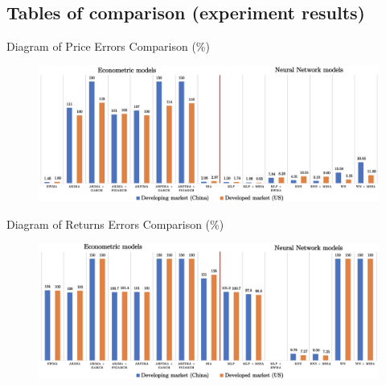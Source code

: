 \documentclass[11pt, aspectratio= 169]{beamer}
\begin{document}
	\subsection{Tables of comparison (experiment results)}
	\begin{frame}{Diagram of Price Errors Comparison (\%)}
		\begin{figure}[H]
			\includegraphics[width= 14cm]{table_prices.png}
		\end{figure}
	\end{frame}

	\begin{frame}{Diagram of Returns Errors Comparison (\%)}
		\begin{figure}[H]
			\includegraphics[width= 14cm]{table_returns.png}
		\end{figure}
	\end{frame}
	
\end{document}
